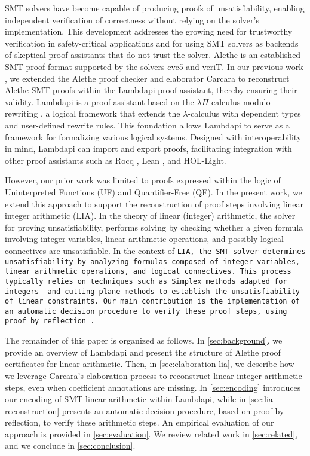 \documentclass[runningheads]{llncs}
\begin{document}
SMT solvers have become capable of producing proofs of unsatisfiability,  enabling independent verification of correctness without relying on the solver's implementation.
This development addresses the growing need for trustworthy verification in safety-critical applications and for using SMT solvers as backends of skeptical proof assistants that do not trust the solver.
Alethe \cite{alethe,alethespec} is an established SMT proof format supported by the solvers cvc5 and veriT. In our previous work \cite{ColtellacciMD24}, we extended the Alethe proof checker and elaborator Carcara \cite{carcara} to
reconstruct Alethe SMT proofs within the Lambdapi proof assistant, thereby ensuring their validity.
Lambdapi \cite{lambdapi} is a proof assistant based on the $\lambda\Pi$-calculus modulo rewriting \cite{lpmodulo}, a logical framework \cite{lf} that extends the $\lambda$-calculus with dependent types and user-defined rewrite rules.
This foundation allows Lambdapi to serve as a framework for formalizing various logical systems.
Designed with interoperability in mind, Lambdapi can import and export proofs, facilitating integration with other proof assistants \cite{LPAR2024:Translating_HOL_Light_proofs} such as Rocq \cite{Rocq-refman}, Lean \cite{lean4:2021}, and HOL-Light. 

However, our prior work was limited to proofs expressed within the logic of Uninterpreted Functions (UF) and Quantifier-Free (QF).
In the present work, we extend this approach to support the reconstruction of proof steps involving linear integer arithmetic (LIA).
In the theory of linear (integer) arithmetic, the solver for proving unsatisfiability, performs solving by checking whether a given formula involving integer variables, linear arithmetic operations, and possibly logical connectives are unsatisfiable.
In the context of \tt{LIA}, the SMT solver determines unsatisfiability by analyzing formulas composed of integer variables, linear arithmetic operations, and logical connectives.
This process typically relies on techniques such as Simplex methods adapted for integers \cite{SRI:simplex:dpllt} and cutting-plane methods to establish the unsatisfiability of linear constraints.
Our main contribution is the implementation of an automatic decision procedure to verify these proof steps, using proof by reflection \cite{reflection-origin-coq,ring-coq}.

The remainder of this paper is organized as follows.
In \cref{sec:background}, we provide an overview of Lambdapi and present the structure of Alethe proof certificates for linear arithmetic.
Then, in \cref{sec:elaboration-lia}, we describe how we leverage Carcara's elaboration process to reconstruct linear integer arithmetic steps, even when coefficient annotations are missing.
In \cref{sec:encoding} introduces our encoding of SMT linear arithmetic within Lambdapi, while in \cref{sec:lia-reconstruction} presents an automatic decision procedure, based on proof by reflection, to verify these arithmetic steps.
An empirical evaluation of our approach is provided in \cref{sec:evaluation}. We review related work in \cref{sec:related}, and we conclude in \cref{sec:conclusion}.
\end{document}
